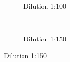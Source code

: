 \begin{figure}
		\centering
            \begin{subfigure}{0.49\textwidth}
                  \flushleft
                  \caption{Dilution 1:100}%
          \end{subfigure}\hfill
          \\
            \begin{subfigure}{0.49\textwidth}
                  \flushleft
                  \caption{Dilution 1:150}%

\end{subfigure}
\end{figure}
